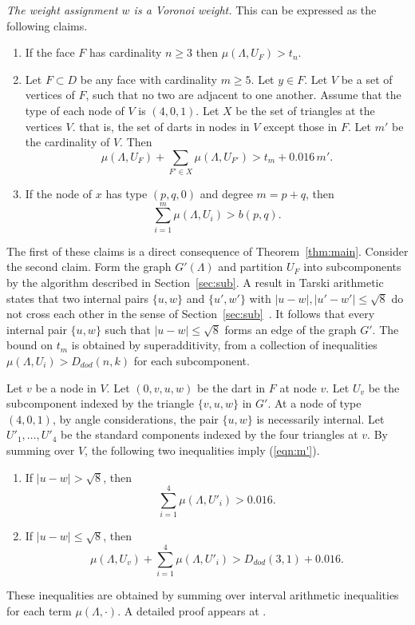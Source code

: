 \documentclass{article} %
\begin{document}
{\it The weight assignment $w$ is a Voronoi weight.}
This can be expressed as the following claims.
\begin{enumerate}
\item If the face $F$  has cardinality $n\ge3$ then $\mu(\Lambda,U_F)> t_n$.
\item Let $F\subset D$ 
be any face with cardinality $m \ge 5$.  Let $y\in F$.
Let $V$ be a set of vertices of $F$, such
that no two are adjacent to one another.  
Assume that the type of each node of $V$ is $(4,0,1)$.
Let $X$ be the set of triangles at the vertices $V$.
that is, the set of darts in nodes in $V$ except those in $F$.
Let $m'$ be the cardinality of $V$.
Then
\begin{equation}\label{eqn:m'}
\mu(\Lambda,U_F) + \sum_{F'\in X} \mu(\Lambda,U_{F'}) > t_m  +  0.016\, m'.
\end{equation}
\item If the node of $x$ has type $(p,q,0)$ and degree $m=p+q$, then
  \begin{equation}\label{eqn:pq}
  \sum_{i=1}^m \mu(\Lambda,U_i) > b(p,q).
  \end{equation}
\end{enumerate}

The first of these claims is a direct consequence of
Theorem~\ref{thm:main}. Consider the second claim. Form the graph
$G'(\Lambda)$ and partition $U_F$ into subcomponents by the algorithm
described in Section~\ref{sec:sub}. A result in Tarski arithmetic
states that two internal pairs $\{u,w\}$ and $\{u',w'\}$ with
$|u-w|,|u'-w'|\le\sqrt8$ do not cross each other in the sense of
Section~\ref{sec:sub}~\cite[Sec.~7.2.1]{Hales:2002:Dodec}. It
follows that every internal pair $\{u,w\}$ such that $|u-w|\le\sqrt8$
forms an edge of the graph $G'$. The bound on $t_m$ is obtained by
superadditivity, from a collection of inequalities
$\mu(\Lambda,U_i)>D_{dod}(n,k)$ for each subcomponent.

Let $v$  be a node in $V$.  Let $(0,v,u,w)$ be the dart in $F$
at node $v$.  Let $U_v$ be the subcomponent indexed by the
triangle $\{v,u,w\}$ in $G'$.
At a node of type $(4,0,1)$, by angle considerations,
the pair $\{u,w\}$ is necessarily internal.
Let $U'_1,\ldots,U'_4$ be the standard components indexed
by the four triangles at $v$. 
By summing over $V$, the following two inequalities
imply (\ref{eqn:m'}).
\begin{enumerate}
\item If $|u-w|>\sqrt8$, then
  $$
  \sum_{i=1}^4\mu(\Lambda,U'_i) > 0.016.
  $$
\item If $|u-w|\le\sqrt8$, then
  $$
  \mu(\Lambda,U_v)+ \sum_{i=1}^4\mu(\Lambda,U'_i) > D_{dod}(3,1) + 0.016.
  $$
\end{enumerate}
These inequalities are obtained by summing over interval arithmetic
inequalities for each term $\mu(\Lambda,\cdot)$.   
A detailed proof appears at \cite[Theorem~8.1]{Hales:2002:Dodec}.
\end{document}
